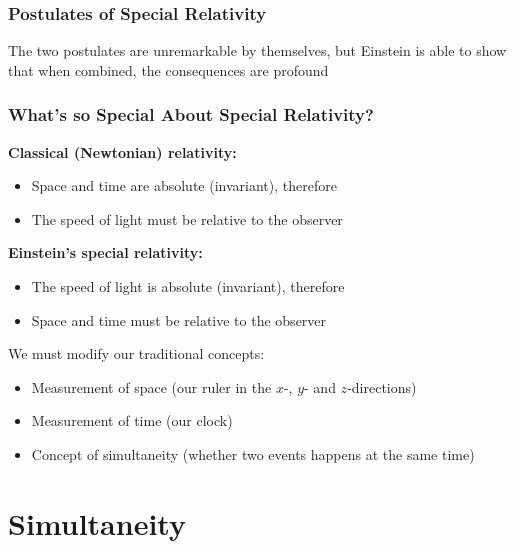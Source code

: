 \documentclass[12pt,compress,aspectratio=169]{beamer}
\begin{document}
\begin{frame}
  \frametitle{Postulates of Special Relativity}
  The two postulates are unremarkable by themselves, but Einstein is able to
  show that when combined, the consequences are profound
\end{frame}

\begin{frame}
  \frametitle{What's so Special About Special Relativity?}

  \textbf{Classical (Newtonian) relativity:}
  \begin{itemize}
  \item Space and time are absolute (invariant), therefore
  \item The speed of light must be relative to the observer
  \end{itemize}

  \textbf{Einstein's special relativity:}
  \begin{itemize}
  \item The speed of light is absolute (invariant), therefore
  \item Space and time must be relative to the observer
  \end{itemize}

  We must modify our traditional concepts:
  \begin{itemize}
  \item Measurement of space (our ruler in the $x$-, $y$- and $z$-directions)
  \item Measurement of time (our clock)
  \item Concept of simultaneity (whether two events happens at the same time)
  \end{itemize}
\end{frame}


\section{Simultaneity}
\end{document}
